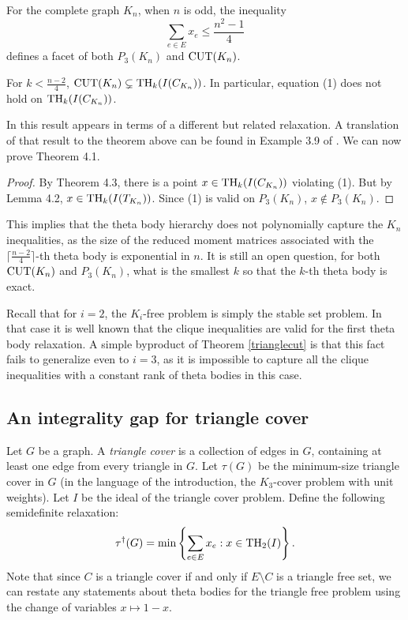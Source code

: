For the complete graph $K_n$, when $n$ is odd, the inequality
\begin{equation} \sum_{e \in E} x_e \le \frac{n^2-1}{4}\end{equation}
defines a facet of both $P_3(K_n)$ and $\textup{CUT}(K_n)$.
\begin{theorem}{\cite[Theorem 6]{moniquestuff}}
For $k < \frac{n-2}{4}$, $\textup{CUT}(K_n) \subsetneq
\textup{TH}_{k}(I(C_{K_n}))$. In particular, equation (1) does not hold on $\textup{TH}_{k}(I(C_{K_n}))$.
\end{theorem}
In \cite{moniquestuff} this result appears in terms of a different but related relaxation.
A translation of that result
to the theorem above can be found in Example 3.9 of \cite{GLPT}. We can now prove Theorem 4.1.

\begin{proof}
By Theorem 4.3, there is a point $x \in \textup{TH}_{k}(I(C_{K_n}))$ violating (1). But by Lemma 4.2, $x \in \textup{TH}_{k}(I(T_{K_n}))$. Since (1) is valid on $P_3(K_n)$, $x \notin P_3(K_n)$.
\end{proof}

This implies that the theta body hierarchy does not polynomially capture the $K_n$ inequalities, as the size of the reduced moment matrices associated with the $\lceil\frac{n-2}{4}\rceil$-th theta body is exponential in $n$. It is still an open question, for both $\textup{CUT}(K_n)$ and $P_3(K_n)$, what is the
smallest $k$ so that the $k$-th theta body is exact.

Recall that for $i=2$, the $K_i$-free problem is simply the stable set problem. In that case it is well known that the clique inequalities
are valid for the first theta body relaxation. A simple byproduct of Theorem \ref{trianglecut} is that this fact fails to generalize even to $i=3$, as it is impossible to capture all the clique inequalities with a constant rank of theta bodies in this case.

\subsection{An integrality gap for triangle cover}
Let $G$ be a graph. A {\it triangle cover} is a collection of edges in $G$, containing at least one edge from every triangle in $G$. Let $\tau(G)$ be the minimum-size triangle cover in $G$ (in the language of the introduction, the $K_3$-cover problem with unit weights). Let $I$ be the ideal of the triangle cover problem. Define the following semidefinite relaxation:
$$\tau^\dagger(G) = \min \left\{\sum_{e \in E} x_e: x \in \textup{TH}_2(I) \right\}.$$
Note that since $C$ is a triangle cover if and only if $E \setminus C$ is a triangle free set, we can restate any statements about theta bodies for the triangle free problem using the change of variables $x \mapsto 1-x$.

